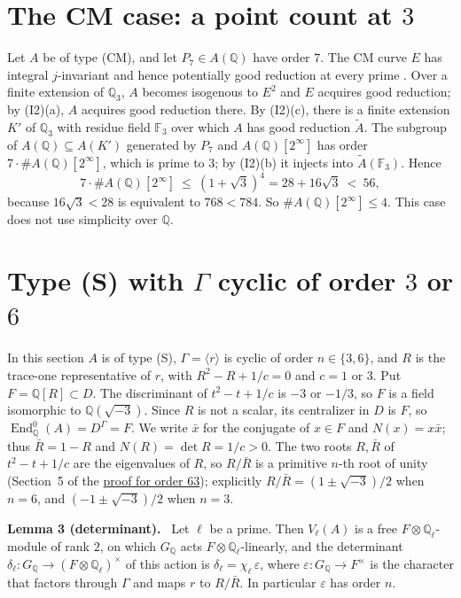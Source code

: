 \documentclass[11pt]{article}
\newenvironment{statement}[1]{\par\medskip\noindent\phantomsection\textbf{#1}\ }{\par\medskip}
\newcommand{\Q}{\mathbb Q}
\newcommand{\F}{\mathbb F}
\DeclareMathOperator{\End}{End}
\begin{document}
\section{The CM case: a point count at \(3\)}\label{cm}

Let \(A\) be of type (CM), and let \(P_7\in A(\Q)\) have order \(7\). The CM curve \(E\) has
integral \(j\)-invariant and hence potentially good reduction at every prime \cite[\S2]{ST}. Over a finite
extension of \(\Q_3\), \(A\) becomes isogenous to \(E^2\) and \(E\) acquires good reduction; by
(I2)(a), \(A\) acquires good reduction there. By (I2)(c), there is a finite extension \(K'\) of
\(\Q_3\) with residue field \(\F_3\) over which \(A\) has good reduction \(\widetilde A\). The
subgroup of \(A(\Q)\subseteq A(K')\) generated by \(P_7\) and \(A(\Q)[2^\infty]\) has order
\(7\cdot\#A(\Q)[2^\infty]\), which is prime to \(3\); by (I2)(b) it injects into
\(\widetilde A(\F_3)\). Hence
\[7\cdot\#A(\Q)[2^\infty]\ \le\ (1+\sqrt3)^4=28+16\sqrt3\ <\ 56,\]
because \(16\sqrt3<28\) is equivalent to \(768<784\). So \(\#A(\Q)[2^\infty]\le4\). This case does
not use simplicity over \(\Q\).

\section{Type (S) with \(\Gamma\) cyclic of order \(3\) or \(6\)}\label{cyclic}

In this section \(A\) is of type (S), \(\Gamma=\langle r\rangle\) is cyclic of order
\(n\in\{3,6\}\), and \(R\) is the trace-one representative of \(r\), with \(R^2-R+1/c=0\) and
\(c=1\) or \(3\). Put \(F=\Q[R]\subset D\). The discriminant of \(t^2-t+1/c\) is \(-3\) or
\(-1/3\), so \(F\) is a field isomorphic to \(\Q(\sqrt{-3})\). Since \(R\) is not a scalar, its
centralizer in \(D\) is \(F\), so \(\End^0_{\Q}(A)=D^\Gamma=F\). We write \(\bar x\) for the
conjugate of \(x\in F\) and \(N(x)=x\bar x\); thus \(\bar R=1-R\) and \(N(R)=\det R=1/c>0\). The
two roots \(R,\bar R\) of \(t^2-t+1/c\) are the eigenvalues of \(R\), so \(R/\bar R\) is a
primitive \(n\)-th root of unity (Section~5 of the
\href{https://genus-2-torsion.github.io/proofs/qsimple-63-obstruction.html#endomorphism-field}{proof
for order 63}); explicitly \(R/\bar R=(1\pm\sqrt{-3})/2\) when \(n=6\), and \((-1\pm\sqrt{-3})/2\)
when \(n=3\).

\begin{statement}{Lemma 3 (determinant).}\label{lemma-det}
Let \(\ell\) be a prime. Then \(V_\ell(A)\) is a free \(F\otimes\Q_\ell\)-module of rank \(2\), on
which \(G_{\Q}\) acts \(F\otimes\Q_\ell\)-linearly, and the determinant
\(\delta_\ell:G_{\Q}\to(F\otimes\Q_\ell)^\times\) of this action is \(\delta_\ell=\chi_\ell\,
\varepsilon\), where \(\varepsilon:G_{\Q}\to F^\times\) is the character that factors through
\(\Gamma\) and maps \(r\) to \(R/\bar R\). In particular \(\varepsilon\) has order \(n\).
\end{statement}
\end{document}
